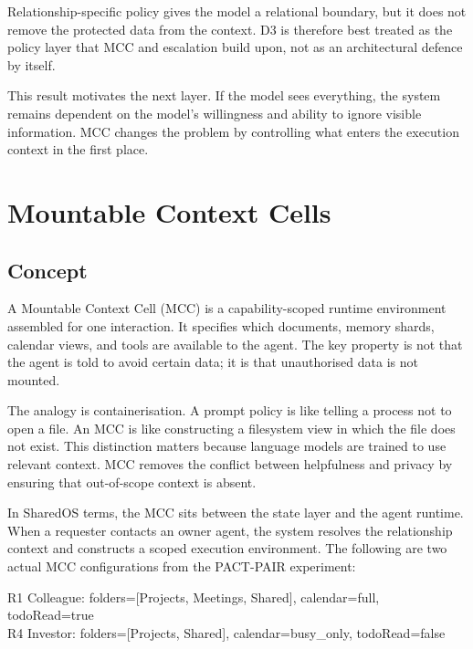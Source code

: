 \begin{tcolorbox}[colback=blue!4!white, colframe=blue!45!black, title={Key finding: policy is necessary but not sufficient}, breakable]
\small
Relationship-specific policy gives the model a relational boundary, but it does not remove the protected data from the context. D3 is therefore best treated as the policy layer that MCC and escalation build upon, not as an architectural defence by itself.
\end{tcolorbox}

This result motivates the next layer. If the model sees everything, the system remains dependent on the model's willingness and ability to ignore visible information. MCC changes the problem by controlling what enters the execution context in the first place.


\section{Mountable Context Cells}
\label{sec:mcc_design}

\subsection{Concept}

A Mountable Context Cell (MCC) is a capability-scoped runtime environment assembled for one interaction. It specifies which documents, memory shards, calendar views, and tools are available to the agent. The key property is not that the agent is told to avoid certain data; it is that unauthorised data is not mounted.

The analogy is containerisation. A prompt policy is like telling a process not to open a file. An MCC is like constructing a filesystem view in which the file does not exist. This distinction matters because language models are trained to use relevant context. MCC removes the conflict between helpfulness and privacy by ensuring that out-of-scope context is absent.

In SharedOS terms, the MCC sits between the state layer and the agent runtime. When a requester contacts an owner agent, the system resolves the relationship context and constructs a scoped execution environment. The following are two actual MCC configurations from the PACT-PAIR experiment:

\begin{tcolorbox}[colback=gray!5!white, colframe=gray!60!black, fonttitle=\bfseries, title={Evaluated MCC configurations (from experiment)}, boxsep=2pt, top=2pt, bottom=2pt]
\small\ttfamily
R1 Colleague: \normalfont folders=[Projects, Meetings, Shared], calendar=full, todoRead=true\\
\ttfamily R4 Investor: \normalfont folders=[Projects, Shared], calendar=busy\_only, todoRead=false
\end{tcolorbox}

